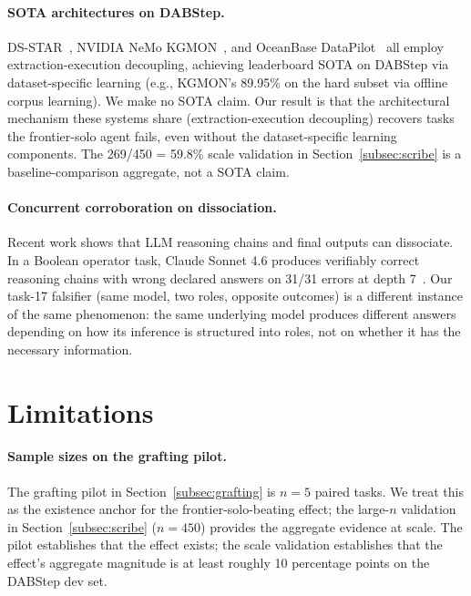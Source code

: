 \documentclass[conference]{IEEEtran}
\newcommand{\Sonnet}{Claude Sonnet 4.6}
\begin{document}
\paragraph{SOTA architectures on DABStep.}
DS-STAR~\cite{dsStar2025}, NVIDIA NeMo KGMON~\cite{nemoKgmon2025}, and OceanBase DataPilot~\cite{oceanbaseDataPilot2025} all employ extraction-execution decoupling, achieving leaderboard SOTA on DABStep via dataset-specific learning (e.g., KGMON's 89.95\% on the hard subset via offline corpus learning). We make no SOTA claim. Our result is that the architectural mechanism these systems share (extraction-execution decoupling) recovers tasks the frontier-solo agent fails, even without the dataset-specific learning components. The 269/450 = 59.8\% scale validation in Section~\ref{subsec:scribe} is a baseline-comparison aggregate, not a SOTA claim.

\paragraph{Concurrent corroboration on dissociation.}
Recent work shows that LLM reasoning chains and final outputs can dissociate. In a Boolean operator task, \Sonnet{} produces verifiably correct reasoning chains with wrong declared answers on 31/31 errors at depth 7~\cite{correctChainsWrongAnswers2026}. Our task-17 falsifier (same model, two roles, opposite outcomes) is a different instance of the same phenomenon: the same underlying model produces different answers depending on how its inference is structured into roles, not on whether it has the necessary information.

\section{Limitations}
\label{sec:limitations}

\paragraph{Sample sizes on the grafting pilot.}
The grafting pilot in Section~\ref{subsec:grafting} is $n=5$ paired tasks. We treat this as the existence anchor for the frontier-solo-beating effect; the large-$n$ validation in Section~\ref{subsec:scribe} ($n=450$) provides the aggregate evidence at scale. The pilot establishes that the effect exists; the scale validation establishes that the effect's aggregate magnitude is at least roughly 10 percentage points on the DABStep dev set.
\end{document}
